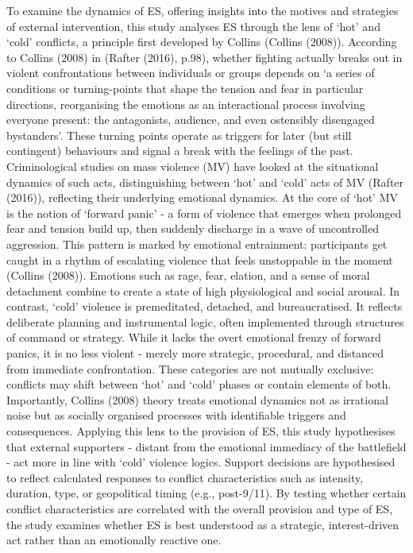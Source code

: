 \documentclass[
]{article}
\begin{document}
To examine the dynamics of ES, offering insights into the motives and
strategies of external intervention, this study analyses ES through the
lens of `hot' and `cold' conflicts, a principle first developed by
Collins (Collins (2008)). According to Collins (2008) in (Rafter (2016),
p.98), whether fighting actually breaks out in violent confrontations
between individuals or groups depends on `a series of conditions or
turning-points that shape the tension and fear in particular directions,
reorganising the emotions as an interactional process involving everyone
present: the antagonists, audience, and even ostensibly disengaged
bystanders'. These turning points operate as triggers for later (but
still contingent) behaviours and signal a break with the feelings of the
past. Criminological studies on mass violence (MV) have looked at the
situational dynamics of such acts, distinguishing between `hot' and
`cold' acts of MV (Rafter (2016)), reflecting their underlying emotional
dynamics. At the core of `hot' MV is the notion of `forward panic' - a
form of violence that emerges when prolonged fear and tension build up,
then suddenly discharge in a wave of uncontrolled aggression. This
pattern is marked by emotional entrainment: participants get caught in a
rhythm of escalating violence that feels unstoppable in the moment
(Collins (2008)). Emotions such as rage, fear, elation, and a sense of
moral detachment combine to create a state of high physiological and
social arousal. In contrast, `cold' violence is premeditated, detached,
and bureaucratised. It reflects deliberate planning and instrumental
logic, often implemented through structures of command or strategy.
While it lacks the overt emotional frenzy of forward panics, it is no
less violent - merely more strategic, procedural, and distanced from
immediate confrontation. These categories are not mutually exclusive:
conflicts may shift between `hot' and `cold' phases or contain elements
of both. Importantly, Collins (2008) theory treats emotional dynamics
not as irrational noise but as socially organised processes with
identifiable triggers and consequences. Applying this lens to the
provision of ES, this study hypothesises that external supporters -
distant from the emotional immediacy of the battlefield - act more in
line with `cold' violence logics. Support decisions are hypothesised to
reflect calculated responses to conflict characteristics such as
intensity, duration, type, or geopolitical timing (e.g., post-9/11). By
testing whether certain conflict characteristics are correlated with the
overall provision and type of ES, the study examines whether ES is best
understood as a strategic, interest-driven act rather than an
emotionally reactive one.
\end{document}

